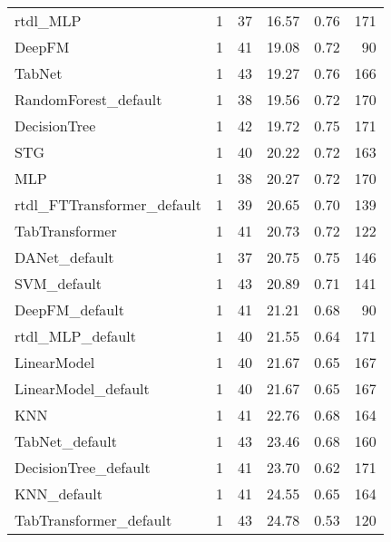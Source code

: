 \begin{tabular}{lrrrrr}
rtdl_MLP                   &            1 &  37 &  16.57 &                     0.76 &   171 \\
DeepFM                     &            1 &  41 &  19.08 &                     0.72 &    90 \\
TabNet                     &            1 &  43 &  19.27 &                     0.76 &   166 \\
RandomForest_default       &            1 &  38 &  19.56 &                     0.72 &   170 \\
DecisionTree               &            1 &  42 &  19.72 &                     0.75 &   171 \\
STG                        &            1 &  40 &  20.22 &                     0.72 &   163 \\
MLP                        &            1 &  38 &  20.27 &                     0.72 &   170 \\
rtdl_FTTransformer_default &            1 &  39 &  20.65 &                     0.70 &   139 \\
TabTransformer             &            1 &  41 &  20.73 &                     0.72 &   122 \\
DANet_default              &            1 &  37 &  20.75 &                     0.75 &   146 \\
SVM_default                &            1 &  43 &  20.89 &                     0.71 &   141 \\
DeepFM_default             &            1 &  41 &  21.21 &                     0.68 &    90 \\
rtdl_MLP_default           &            1 &  40 &  21.55 &                     0.64 &   171 \\
LinearModel                &            1 &  40 &  21.67 &                     0.65 &   167 \\
LinearModel_default        &            1 &  40 &  21.67 &                     0.65 &   167 \\
KNN                        &            1 &  41 &  22.76 &                     0.68 &   164 \\
TabNet_default             &            1 &  43 &  23.46 &                     0.68 &   160 \\
DecisionTree_default       &            1 &  41 &  23.70 &                     0.62 &   171 \\
KNN_default                &            1 &  41 &  24.55 &                     0.65 &   164 \\
TabTransformer_default     &            1 &  43 &  24.78 &                     0.53 &   120 \\

\end{tabular}
